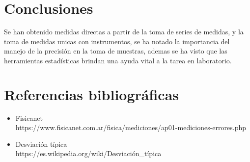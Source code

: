 \documentclass[letter,11pt]{article}
\begin{document}
\section{Conclusiones}
Se han obtenido medidas directas a partir de la toma de series de medidas,
y la toma de medidas unicas con instrumentos, se ha notado la importancia del
manejo de la precisión en la toma de muestras, ademas se ha visto que las
herramientas estadísticas brindan una ayuda vital a la tarea en laboratorio.

\section{Referencias bibliográficas}
\begin{itemize}
\item Fisicanet \\
https://www.fisicanet.com.ar/fisica/mediciones/ap01-mediciones-errores.php
\item Desviación típica \\
https://es.wikipedia.org/wiki/Desviación\_típica
\end{itemize}
\end{document}
